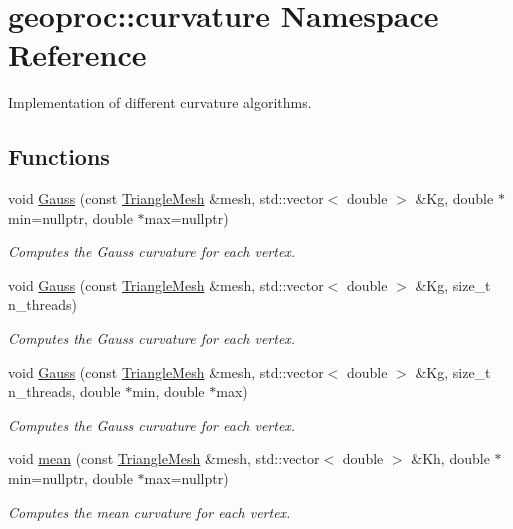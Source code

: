 \hypertarget{namespacegeoproc_1_1curvature}{}\section{geoproc\+:\+:curvature Namespace Reference}
\label{namespacegeoproc_1_1curvature}


Implementation of different curvature algorithms.  


\subsection*{Functions}
\begin{DoxyCompactItemize}
\item 
void \hyperlink{namespacegeoproc_1_1curvature_ac05fe4b3f804678c768241f17f52bb9a}{Gauss} (const \hyperlink{classgeoproc_1_1TriangleMesh}{Triangle\+Mesh} \&mesh, std\+::vector$<$ double $>$ \&Kg, double $\ast$min=nullptr, double $\ast$max=nullptr)
\begin{DoxyCompactList}\small\item\em Computes the Gauss curvature for each vertex. \end{DoxyCompactList}\item 
void \hyperlink{namespacegeoproc_1_1curvature_a769aa493a6028dbd553b6e40711662f8}{Gauss} (const \hyperlink{classgeoproc_1_1TriangleMesh}{Triangle\+Mesh} \&mesh, std\+::vector$<$ double $>$ \&Kg, size\+\_\+t n\+\_\+threads)
\begin{DoxyCompactList}\small\item\em Computes the Gauss curvature for each vertex. \end{DoxyCompactList}\item 
void \hyperlink{namespacegeoproc_1_1curvature_a76b1a28725ce587aec2b5a5d452fb019}{Gauss} (const \hyperlink{classgeoproc_1_1TriangleMesh}{Triangle\+Mesh} \&mesh, std\+::vector$<$ double $>$ \&Kg, size\+\_\+t n\+\_\+threads, double $\ast$min, double $\ast$max)
\begin{DoxyCompactList}\small\item\em Computes the Gauss curvature for each vertex. \end{DoxyCompactList}\item 
void \hyperlink{namespacegeoproc_1_1curvature_a9ccfeae3d3672f6627f4de90bd8ffb0c}{mean} (const \hyperlink{classgeoproc_1_1TriangleMesh}{Triangle\+Mesh} \&mesh, std\+::vector$<$ double $>$ \&Kh, double $\ast$min=nullptr, double $\ast$max=nullptr)
\begin{DoxyCompactList}\small\item\em Computes the mean curvature for each vertex. \end{DoxyCompactList}\item 

\end{DoxyCompactItemize}

